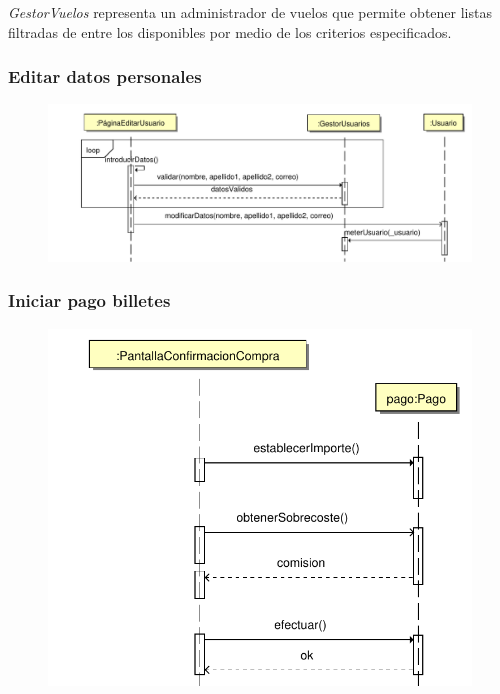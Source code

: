 \documentclass[11pt, a4paper, twoside, titlepage]{article}
\begin{document}
				{\itshape GestorVuelos} representa un administrador de vuelos que permite obtener listas filtradas de entre los disponibles por medio de los criterios especificados.
			
			\subsubsection{Editar datos personales}
				\begin{figure}[H]\centering
					\includegraphics[scale=.7]{diagramas/editardatospersonales.pdf}
				\end{figure}


			\subsubsection{Iniciar pago billetes}
				\begin{figure}[H]\centering
					\includegraphics[scale=.7]{diagramas/iniciarpagobilletes.pdf}
				\end{figure}
\end{document}
